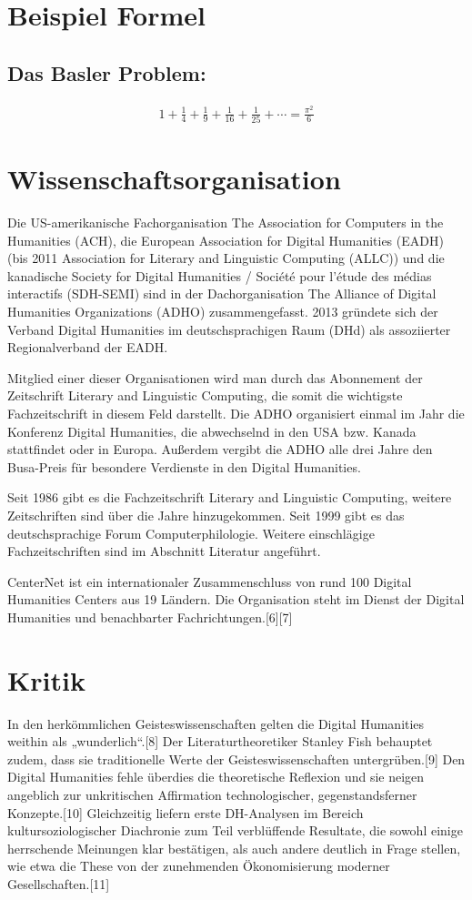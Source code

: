 \documentclass{article}
\begin{document}
\section{Beispiel Formel}
\subsection{Das Basler Problem:}
\begin{align}

    \displaystyle1 + \frac{1}{4}+\frac{1}{9}+\frac{1}{16}+\frac{1}{25}+\cdots =\frac{\pi^2}{6} 
\end{align}

\section{Wissenschaftsorganisation}
Die US-amerikanische Fachorganisation The Association for Computers in the Humanities (ACH), die European Association for Digital Humanities (EADH) (bis 2011 Association for Literary and Linguistic Computing (ALLC)) und die kanadische Society for Digital Humanities / Société pour l'étude des médias interactifs (SDH-SEMI) sind in der Dachorganisation The Alliance of Digital Humanities Organizations (ADHO) zusammengefasst. 2013 gründete sich der Verband Digital Humanities im deutschsprachigen Raum (DHd) als assoziierter Regionalverband der EADH.

Mitglied einer dieser Organisationen wird man durch das Abonnement der Zeitschrift Literary and Linguistic Computing, die somit die wichtigste Fachzeitschrift in diesem Feld darstellt. Die ADHO organisiert einmal im Jahr die Konferenz Digital Humanities, die abwechselnd in den USA bzw. Kanada stattfindet oder in Europa. Außerdem vergibt die ADHO alle drei Jahre den Busa-Preis für besondere Verdienste in den Digital Humanities.

Seit 1986 gibt es die Fachzeitschrift Literary and Linguistic Computing, weitere Zeitschriften sind über die Jahre hinzugekommen. Seit 1999 gibt es das deutschsprachige Forum Computerphilologie. Weitere einschlägige Fachzeitschriften sind im Abschnitt Literatur angeführt.

CenterNet ist ein internationaler Zusammenschluss von rund 100 Digital Humanities Centers aus 19 Ländern. Die Organisation steht im Dienst der Digital Humanities und benachbarter Fachrichtungen.[6][7]

\section{Kritik}
In den herkömmlichen Geisteswissenschaften gelten die Digital Humanities weithin als „wunderlich“.[8] Der Literaturtheoretiker Stanley Fish behauptet zudem, dass sie traditionelle Werte der Geisteswissenschaften untergrüben.[9] Den Digital Humanities fehle überdies die theoretische Reflexion und sie neigen angeblich zur unkritischen Affirmation technologischer, gegenstandsferner Konzepte.[10] Gleichzeitig liefern erste DH-Analysen im Bereich kultursoziologischer Diachronie zum Teil verblüffende Resultate, die sowohl einige herrschende Meinungen klar bestätigen, als auch andere deutlich in Frage stellen, wie etwa die These von der zunehmenden Ökonomisierung moderner Gesellschaften.[11]
\end{document}
